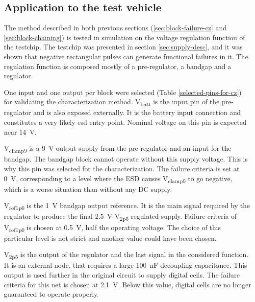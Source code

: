 \subsection{Application to the test vehicle}
\label{sec:application-test-vehicle}

The method described in both previous sections (\ref{sec:block-failure-cz} and \ref{sec:block-chaining}) is tested in simulation on the voltage regulation function of the testchip.
The testchip was presented in section \ref{sec:supply-desc}, and it was shown that negative rectangular pulses can generate functional failures in it.
The regulation function is composed mostly of a pre-regulator, a bandgap and a regulator.

One input and one output per block were selected (Table \ref{selected-pins-for-cz}) for validating the characterization method.
V\textsubscript{batt} is the input pin of the pre-regulator and is also exposed externally.
It is the battery input connection and constitutes a very likely \gls{esd} entry point.
Nominal voltage on this pin is expected near \SI{14}{\volt}.

V\textsubscript{clamp9} is a \SI{9}{\volt} output supply from the pre-regulator and an input for the bandgap.
The bandgap block cannot operate without this supply voltage.
This is why this pin was selected for the characterization.
The failure criteria is set at \SI{0}{\volt}, corresponding to a level where the ESD causes V\textsubscript{clamp9} to go negative, which is a worse situation than without any DC supply.

V\textsubscript{ref1p0} is the \SI{1}{\volt} bandgap output reference.
It is the main signal required by the regulator to produce the final \SI{2.5}{\volt} V\textsubscript{2p5} regulated supply.
Failure criteria of V\textsubscript{ref1p0} is chosen at \SI{0.5}{\volt}, half the operating voltage.
The choice of this particular level is not strict and another value could have been chosen.

V\textsubscript{2p5} is the output of the regulator and the last signal in the considered function.
It is an external node, that requires a large \SI{100}{\nano\farad} decoupling capacitance.
This output is used further in the original circuit to supply digital cells.
The failure criteria for this net is chosen at \SI{2.1}{\volt}.
Below this value, digital cells are no longer guaranteed to operate properly.


